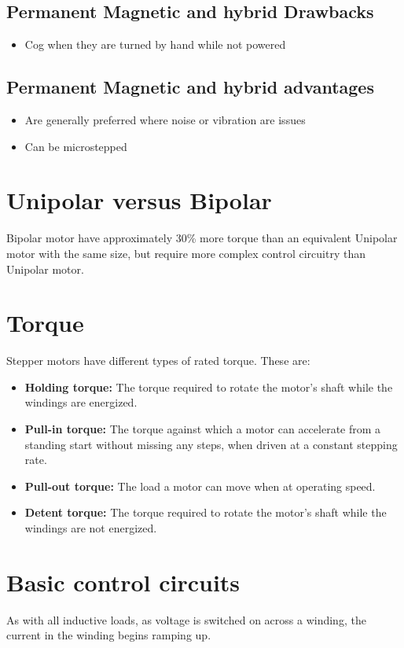 \documentclass{report}
\begin{document}
\subsection*{Permanent Magnetic and hybrid Drawbacks}
\begin{itemize}
  \item Cog when they are turned by hand while not powered 
\end{itemize}

\subsection*{Permanent Magnetic and hybrid advantages}
\begin{itemize}
  \item Are generally preferred where noise or vibration are issues
  \item Can be microstepped
\end{itemize}

\section*{Unipolar versus Bipolar}
Bipolar motor have approximately 30\% more torque than an equivalent Unipolar motor with the same size,
but require more complex control circuitry than Unipolar motor. 

\section*{Torque}
Stepper motors have different types of rated torque. These are:
\begin{itemize}
  \item \textbf{Holding torque:} The torque required to rotate the
        motor’s shaft while the windings are energized.
  \item \textbf{Pull-in torque:} The torque against which a motor
        can accelerate from a standing start without
        missing any steps, when driven at a constant
        stepping rate.
  \item \textbf{Pull-out torque:} The load a motor can move
        when at operating speed.
  \item \textbf{Detent torque:} The torque required to rotate the
        motor’s shaft while the windings are not
        energized.
\end{itemize}

\section*{Basic control circuits}
As with all inductive loads, as voltage is switched on across a winding, the current in the winding begins
ramping up.
\end{document}
